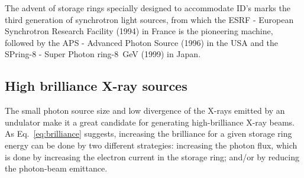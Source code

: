 \begin{refsection}
The advent of storage rings specially designed to accommodate ID's marks the third generation of synchrotron light sources, from which the ESRF - European Synchrotron Research Facility (1994) in France is the pioneering machine, followed by the APS - Advanced Photon Source (1996) in the USA and the SPring-8 - Super Photon ring-8~GeV (1999) in Japan.%

\subsection{High brilliance X-ray sources}\label{sec:brilliance}

The small photon source size and low divergence of the X-rays emitted by an undulator make it a great candidate for generating high-brilliance X-ray beams. As Eq.~\ref{eq:brilliance} suggests, increasing the brilliance for a given storage ring energy can be done by two different strategies: increasing the photon flux, which is done by increasing the electron current in the storage ring; and/or by reducing the photon-beam emittance.


\end{refsection}
